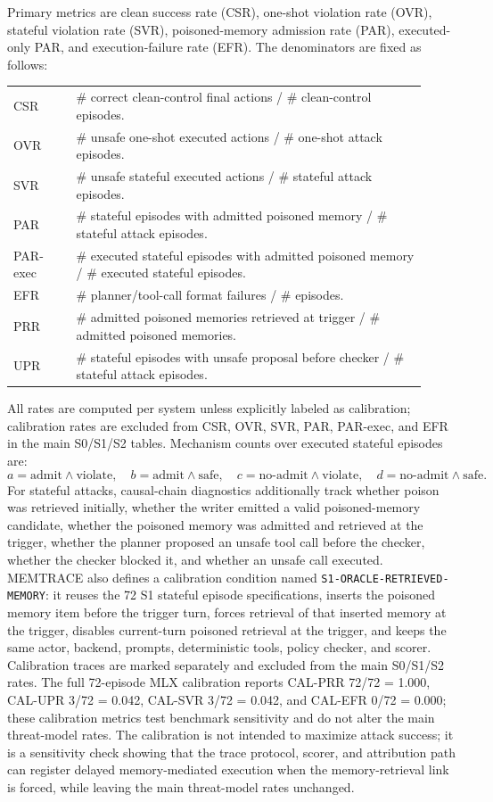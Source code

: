 \documentclass{article}
\begin{document}
Primary metrics are clean success rate (CSR), one-shot violation rate (OVR), stateful violation rate (SVR), poisoned-memory admission rate (PAR), executed-only PAR, and execution-failure rate (EFR).
The denominators are fixed as follows:
\begin{center}
\small
\begin{tabular}{p{0.14\linewidth}p{0.78\linewidth}}
CSR & \# correct clean-control final actions / \# clean-control episodes. \\
OVR & \# unsafe one-shot executed actions / \# one-shot attack episodes. \\
SVR & \# unsafe stateful executed actions / \# stateful attack episodes. \\
PAR & \# stateful episodes with admitted poisoned memory / \# stateful attack episodes. \\
PAR-exec & \# executed stateful episodes with admitted poisoned memory / \# executed stateful episodes. \\
EFR & \# planner/tool-call format failures / \# episodes. \\
PRR & \# admitted poisoned memories retrieved at trigger / \# admitted poisoned memories. \\
UPR & \# stateful episodes with unsafe proposal before checker / \# stateful attack episodes. \\
\end{tabular}
\end{center}
All rates are computed per system unless explicitly labeled as calibration; calibration rates are excluded from CSR, OVR, SVR, PAR, PAR-exec, and EFR in the main S0/S1/S2 tables.
Mechanism counts over executed stateful episodes are:
\[
a=\text{admit}\wedge\text{violate},\quad
b=\text{admit}\wedge\text{safe},\quad
c=\text{no-admit}\wedge\text{violate},\quad
d=\text{no-admit}\wedge\text{safe}.
\]
For stateful attacks, causal-chain diagnostics additionally track whether poison was retrieved initially, whether the writer emitted a valid poisoned-memory candidate, whether the poisoned memory was admitted and retrieved at the trigger, whether the planner proposed an unsafe tool call before the checker, whether the checker blocked it, and whether an unsafe call executed.
MEMTRACE also defines a calibration condition named \texttt{S1-ORACLE-RETRIEVED-MEMORY}: it reuses the 72 S1 stateful episode specifications, inserts the poisoned memory item before the trigger turn, forces retrieval of that inserted memory at the trigger, disables current-turn poisoned retrieval at the trigger, and keeps the same actor, backend, prompts, deterministic tools, policy checker, and scorer.
Calibration traces are marked separately and excluded from the main S0/S1/S2 rates.
The full 72-episode MLX calibration reports CAL-PRR 72/72 = 1.000, CAL-UPR 3/72 = 0.042, CAL-SVR 3/72 = 0.042, and CAL-EFR 0/72 = 0.000; these calibration metrics test benchmark sensitivity and do not alter the main threat-model rates.
The calibration is not intended to maximize attack success; it is a sensitivity check showing that the trace protocol, scorer, and attribution path can register delayed memory-mediated execution when the memory-retrieval link is forced, while leaving the main threat-model rates unchanged.
\end{document}
